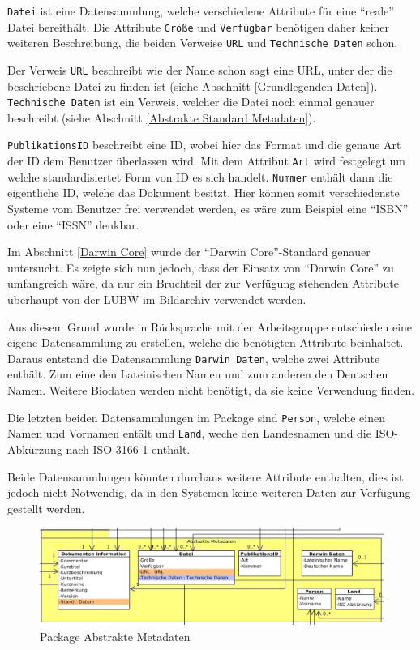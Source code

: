 \texttt{Datei} ist eine Datensammlung, welche verschiedene Attribute f\"ur eine "`reale"' Datei bereith\"alt. Die Attribute \texttt{Gr\"o\ss{}e} und \texttt{Verf\"ugbar} ben\"otigen daher keiner weiteren Beschreibung, die beiden Verweise \texttt{URL} und \texttt{Technische Daten} schon. 

Der Verweis \texttt{URL} beschreibt wie der Name schon sagt eine URL, unter der die beschriebene Datei zu finden ist (siehe Abschnitt \ref{Grundlegenden Daten}). \texttt{Technische Daten} ist ein Verweis, welcher die Datei noch einmal genauer beschreibt (siehe Abschnitt \ref{Abstrakte Standard Metadaten}).

\texttt{PublikationsID} beschreibt eine ID, wobei hier das Format und die genaue Art der ID dem Benutzer \"uberlassen wird. Mit dem Attribut \texttt{Art} wird festgelegt um welche standardisiertet Form von ID es sich handelt. \texttt{Nummer} enth\"alt dann die eigentliche ID, welche das Dokument besitzt. Hier k\"onnen somit verschiedenste Systeme vom Benutzer frei verwendet werden, es w\"are zum Beispiel eine "`ISBN"' oder eine "`ISSN"' denkbar.

Im Abschnitt \ref{Darwin Core} wurde der "`Darwin Core"'-Standard genauer untersucht. Es zeigte sich nun jedoch, dass der Einsatz von "`Darwin Core"' zu umfangreich w\"are, da nur ein Bruchteil der zur Verf\"ugung stehenden Attribute \"uberhaupt von der \ac{LUBW} im Bildarchiv verwendet werden.

Aus diesem Grund wurde in R\"ucksprache mit der Arbeitsgruppe entschieden eine eigene Datensammlung zu erstellen, welche die ben\"otigten Attribute beinhaltet. Daraus entstand die Datensammlung \texttt{Darwin Daten}, welche zwei Attribute enth\"alt. Zum eine den Lateinischen Namen und zum anderen den Deutschen Namen. Weitere Biodaten werden nicht ben\"otigt, da sie keine Verwendung finden.

Die letzten beiden Datensammlungen im Package sind \texttt{Person}, welche einen Namen und Vornamen ent\"alt und \texttt{Land}, weche den Landesnamen und die ISO-Abk\"urzung nach ISO 3166-1 enth\"alt.

Beide Datensammlungen k\"onnten durchaus weitere Attribute enthalten, dies ist jedoch nicht Notwendig, da in den Systemen keine weiteren Daten zur Verf\"ugung gestellt werden.
\begin{figure}[!ht]
\centering
\includegraphics[width=15cm]{Bilder/Datenmodell/Package-Abstrakte-Metadaten.jpg}
\caption{Package Abstrakte Metadaten}
\label{Package Abstrakte Metadaten}
\centering
\end{figure}


